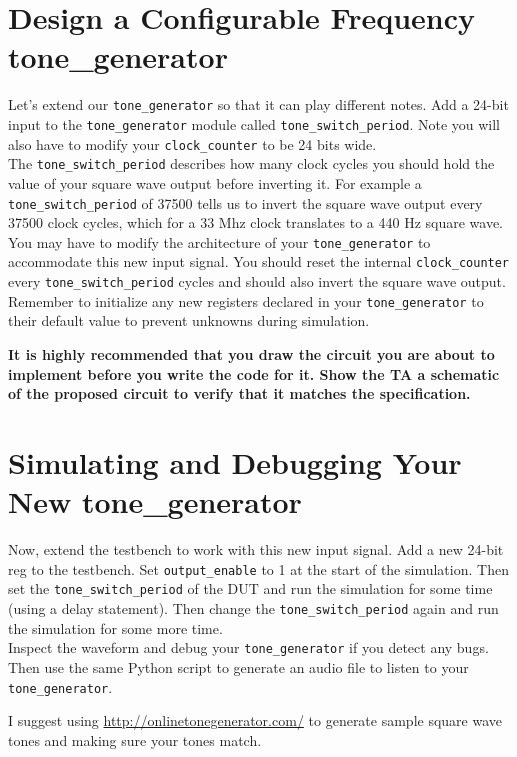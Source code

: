 \documentclass[11pt]{article}
\begin{document}
\section{Design a Configurable Frequency tone\_generator}

Let's extend our \verb|tone_generator| so that it can play different notes. Add a 24-bit input to the \verb|tone_generator| module called \verb|tone_switch_period|. Note you will also have to modify your \verb|clock_counter| to be 24 bits wide.\\

The \verb|tone_switch_period| describes how many clock cycles you should hold the value of your square wave output before inverting it. For example a \verb|tone_switch_period| of 37500 tells us to invert the square wave output every 37500 clock cycles, which for a 33 Mhz clock translates to a 440 Hz square wave.\\

You may have to modify the architecture of your \verb|tone_generator| to accommodate this new input signal. You should reset the internal \verb|clock_counter| every \verb|tone_switch_period| cycles and should also invert the square wave output. Remember to initialize any new registers declared in your \verb|tone_generator| to their default value to prevent unknowns during simulation.

\textbf{It is highly recommended that you draw the circuit you are about to implement before you write the code for it. Show the TA a schematic of the proposed circuit to verify that it matches the specification.}
\section{Simulating and Debugging Your New tone\_generator}

Now, extend the testbench to work with this new input signal. Add a new 24-bit reg to the testbench. Set \verb|output_enable| to 1 at the start of the simulation. Then set the \verb|tone_switch_period| of the DUT and run the simulation for some time (using a delay statement). Then change the \verb|tone_switch_period| again and run the simulation for some more time.\\

Inspect the waveform and debug your \verb|tone_generator| if you detect any bugs. Then use the same Python script to generate an audio file to listen to your \verb|tone_generator|.

I suggest using \url{http://onlinetonegenerator.com/} to generate sample square wave tones and making sure your tones match.\\
\end{document}
